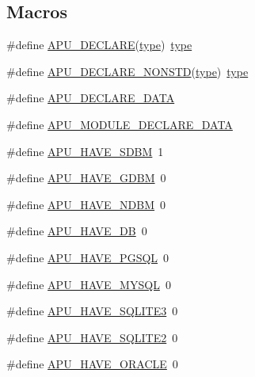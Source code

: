 \subsection*{Macros}
\begin{DoxyCompactItemize}
\item 
\#define \hyperlink{group__APR__Util_ga408498ed57031391c19bf360cc61733a}{A\+P\+U\+\_\+\+D\+E\+C\+L\+A\+RE}(\hyperlink{pcre_8txt_a2463fbbe8b0c90b90db12195e1edaa5d}{type})~\hyperlink{pcre_8txt_a2463fbbe8b0c90b90db12195e1edaa5d}{type}
\item 
\#define \hyperlink{group__APR__Util_ga03b160043a3b3a93e975085361683ff0}{A\+P\+U\+\_\+\+D\+E\+C\+L\+A\+R\+E\+\_\+\+N\+O\+N\+S\+TD}(\hyperlink{pcre_8txt_a2463fbbe8b0c90b90db12195e1edaa5d}{type})~\hyperlink{pcre_8txt_a2463fbbe8b0c90b90db12195e1edaa5d}{type}
\item 
\#define \hyperlink{group__APR__Util_ga7009cc3d445c4b2f93c80990230d7b3f}{A\+P\+U\+\_\+\+D\+E\+C\+L\+A\+R\+E\+\_\+\+D\+A\+TA}
\item 
\#define \hyperlink{group__APR__Util_ga9b0c0f8fe6546018d3a84a87fc3938f5}{A\+P\+U\+\_\+\+M\+O\+D\+U\+L\+E\+\_\+\+D\+E\+C\+L\+A\+R\+E\+\_\+\+D\+A\+TA}
\item 
\#define \hyperlink{group__APR__Util_ga3a1ebf50d2a0bdb96f286004d29efbd3}{A\+P\+U\+\_\+\+H\+A\+V\+E\+\_\+\+S\+D\+BM}~1
\item 
\#define \hyperlink{group__APR__Util_ga34ced7f6008f09de7f93d477b1c127a1}{A\+P\+U\+\_\+\+H\+A\+V\+E\+\_\+\+G\+D\+BM}~0
\item 
\#define \hyperlink{group__APR__Util_ga943eb69735e3e25b4eff0ab3a30c2aa7}{A\+P\+U\+\_\+\+H\+A\+V\+E\+\_\+\+N\+D\+BM}~0
\item 
\#define \hyperlink{group__APR__Util_gabcb2f1d6b7ac86678bfaa36d78477b8c}{A\+P\+U\+\_\+\+H\+A\+V\+E\+\_\+\+DB}~0
\item 
\#define \hyperlink{group__APR__Util_ga11a85b2049f152a2f5b4a89afa6051b7}{A\+P\+U\+\_\+\+H\+A\+V\+E\+\_\+\+P\+G\+S\+QL}~0
\item 
\#define \hyperlink{group__APR__Util_gaf2b3aa8611321923353609fd49cfd7ad}{A\+P\+U\+\_\+\+H\+A\+V\+E\+\_\+\+M\+Y\+S\+QL}~0
\item 
\#define \hyperlink{group__APR__Util_ga1af39b80385311f086372077039e5cee}{A\+P\+U\+\_\+\+H\+A\+V\+E\+\_\+\+S\+Q\+L\+I\+T\+E3}~0
\item 
\#define \hyperlink{group__APR__Util_gafabfc94fb20df271e67ee9832cfed72f}{A\+P\+U\+\_\+\+H\+A\+V\+E\+\_\+\+S\+Q\+L\+I\+T\+E2}~0
\item 
\#define \hyperlink{group__APR__Util_gafdfb415d18dd26143342b8e2ff7c657d}{A\+P\+U\+\_\+\+H\+A\+V\+E\+\_\+\+O\+R\+A\+C\+LE}~0

\end{DoxyCompactItemize}
